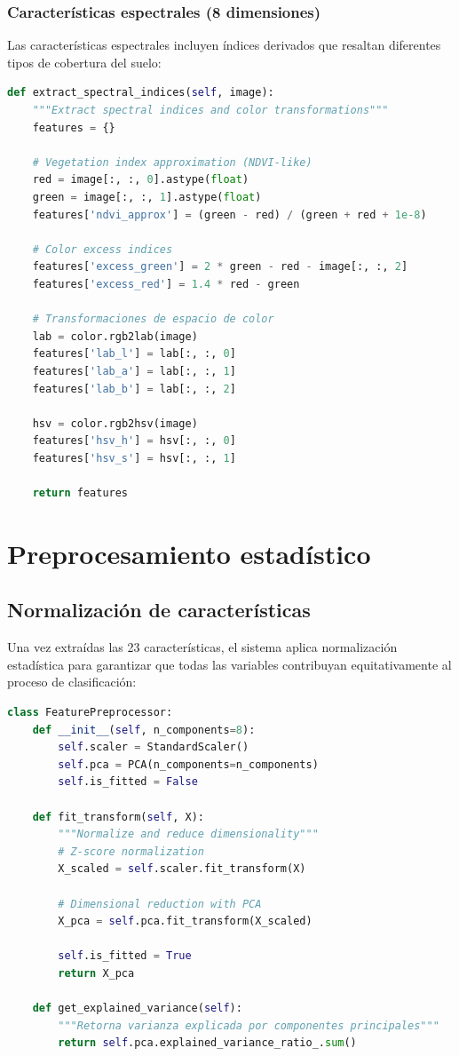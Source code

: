\subsubsection{Características espectrales (8 dimensiones)}

Las características espectrales incluyen índices derivados que resaltan diferentes tipos de cobertura del suelo:

\begin{lstlisting}[language=Python, caption=Implementación de características espectrales]
def extract_spectral_indices(self, image):
	"""Extract spectral indices and color transformations"""
	features = {}
    
	# Vegetation index approximation (NDVI-like)
	red = image[:, :, 0].astype(float)
	green = image[:, :, 1].astype(float)
	features['ndvi_approx'] = (green - red) / (green + red + 1e-8)
    
	# Color excess indices
	features['excess_green'] = 2 * green - red - image[:, :, 2]
	features['excess_red'] = 1.4 * red - green
    
	# Transformaciones de espacio de color
	lab = color.rgb2lab(image)
	features['lab_l'] = lab[:, :, 0]
	features['lab_a'] = lab[:, :, 1] 
	features['lab_b'] = lab[:, :, 2]
    
	hsv = color.rgb2hsv(image)
	features['hsv_h'] = hsv[:, :, 0]
	features['hsv_s'] = hsv[:, :, 1]
    
	return features
\end{lstlisting}

\section{Preprocesamiento estadístico}

\subsection{Normalización de características}

Una vez extraídas las 23 características, el sistema aplica normalización estadística para garantizar que todas las variables contribuyan equitativamente al proceso de clasificación:

\begin{lstlisting}[language=Python, caption=Normalización estadística]
class FeaturePreprocessor:
	def __init__(self, n_components=8):
		self.scaler = StandardScaler()
		self.pca = PCA(n_components=n_components)
		self.is_fitted = False
    
	def fit_transform(self, X):
		"""Normalize and reduce dimensionality"""
		# Z-score normalization
		X_scaled = self.scaler.fit_transform(X)
        
		# Dimensional reduction with PCA
		X_pca = self.pca.fit_transform(X_scaled)
        
		self.is_fitted = True
		return X_pca
    
	def get_explained_variance(self):
		"""Retorna varianza explicada por componentes principales"""
		return self.pca.explained_variance_ratio_.sum()
\end{lstlisting}

